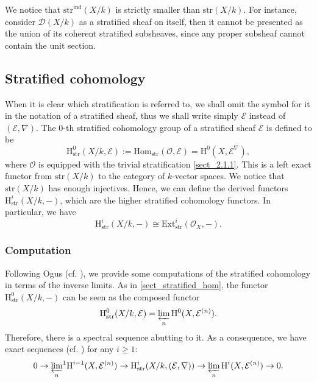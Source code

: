 \documentclass[12pt,a4]{amsart}
\theoremstyle{definition}
\begin{document}

\subsubsection{} 
We notice that $\mathrm{str}^\text{ind}(X/k)$ is strictly smaller than $\mathrm{str}(X/k)$. For instance, consider $\mathcal D(X/k)$ as a stratified sheaf on itself, then it cannot be presented as the union of its coherent
stratified subsheaves, since any proper subsheaf cannot contain the unit section. 
\subsection{Stratified cohomology} \label{sect_str_cohomology}
When it is clear which stratification is referred to, we shall omit the symbol for it in the
notation of a stratified sheaf, thus we shall write simply $\mathcal E$ instead of
$(\mathcal E,\nabla)$. 
The $0$-th stratified cohomology group of a stratified sheaf $\mathcal E$ 
is defined to be
$$\mathrm H^0_\text{str}(X/k, \mathcal E) :=
\mathrm{Hom}_\text{str}(\mathcal O,\mathcal E)=
 \mathrm{H}^0(X,\mathcal{E}^{\nabla}),$$
 where $\mathcal O$ is equipped with the trivial stratification \ref{sect_2.1.1}. 
This is a left exact functor from $\text{str}(X/k)$ to the category of
$k$-vector spaces. We notice that $\text{str}(X/k)$ has enough injectives.
Hence, we can define the
derived functors $\mathrm H^i_\text{str}(X/k,-)$, which are the higher
stratified cohomology functors. In particular, we have
$$\mathrm H^i_\text{str}(X/k,-)\cong \mathrm{Ext}^i_\mathrm{str}(\mathcal O_X,-).$$


\subsubsection{Computation} \label{sect_Ogus}
Following Ogus (cf. \cite{Og75}), 
we provide some computations of the stratified cohomology
in terms of the inverse limits. 
As in \ref{sect_stratified_hom}, the functor $\mathrm H^0_\text{str}(X/k,-)$ can be seen as
the composed functor
$$\mathrm H^0_\text{str}(X/k,\mathcal E)=\varprojlim_n \mathrm H^0(X, \mathcal E^{(n)}).$$
Therefore, there is a spectral sequence abutting to it. As a consequence, we
have exact sequences (cf. \cite[Theorem 2.4]{Og75})
for any $i \geq 1$:
$$0 \rightarrow {\varprojlim_n}^1\text H^{i-1}(X, \mathcal E^{(n)}) 
\rightarrow\text H^i_\text{str}(X/k, (\mathcal E,\nabla)) \rightarrow 
\varprojlim_n \text H^i(X, \mathcal E^{(n)}) \rightarrow 0.$$
\end{document}
